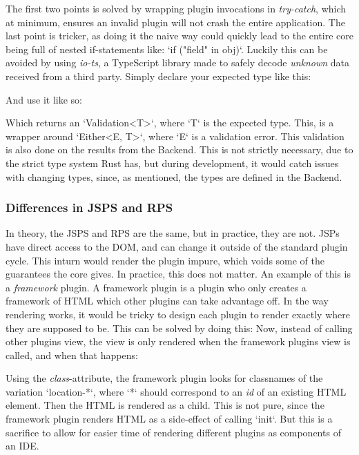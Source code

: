 \documentclass[runningheads]{llncs}
\begin{document}
The first two points is solved by wrapping plugin invocations in
\textit{try-catch}, which at minimum, ensures an invalid plugin will not crash
the entire application. The last point is tricker, as doing it the naive way
could quickly lead to the entire core being full of nested if-statements like:
`if ("field" in obj)`. Luckily this can be avoided by using \textit{io-ts}, a
TypeScript library made to safely decode \textit{unknown} data received from a
third party.
Simply declare your expected type like this: %

And use it like so: %

Which returns an `Validation<T>`, where `T` is the expected type. This, is a
wrapper around `Either<E, T>`, where `E` is a validation error. This validation
is also done on the results from the Backend.
This is not strictly necessary, due to the strict type system Rust has, but
during development, it would catch issues with changing types, since, as
mentioned, the types are defined in the Backend.

\subsubsection{Differences in JSPS and RPS}
In theory, the JSPS and RPS are the same, but in practice, they are not. JSPs
have direct access to the DOM, and can change it outside of the standard plugin
cycle. This inturn would render the plugin impure, which voids some of the
guarantees the core gives.
In practice, this does not matter. An example of this is a \textit{framework}
plugin. A framework plugin is a plugin who only creates a framework of HTML
which other plugins can take advantage off.
In the way rendering works, it would be tricky to design each plugin to render
exactly where they are supposed to be. This can be solved by doing this:
Now, instead of calling other plugins view, the view is only rendered when the
framework plugins view is called, and when that happens:

Using the \textit{class}-attribute, the framework plugin looks for classnames of
the variation `location-*`, where `*` should correspond to an \textit{id} of an
existing HTML element. Then the HTML is rendered as a child. This is not pure,
since the framework plugin renders HTML as a side-effect of calling `init`. But
this is a sacrifice to allow for easier time of rendering different plugins as
components of an IDE.
\end{document}
